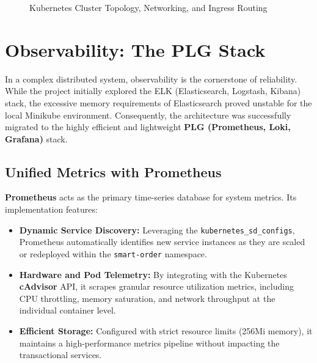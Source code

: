 \documentclass[12pt,a4paper]{report}
\begin{document}
\begin{figure}[H]
    \centering
    \vspace{8cm} %
    \caption{Kubernetes Cluster Topology, Networking, and Ingress Routing}
\end{figure}

\chapter{Observability: The PLG Stack}
In a complex distributed system, observability is the cornerstone of reliability. While the project initially explored the ELK (Elasticsearch, Logstash, Kibana) stack, the excessive memory requirements of Elasticsearch proved unstable for the local Minikube environment. Consequently, the architecture was successfully migrated to the highly efficient and lightweight \textbf{PLG (Prometheus, Loki, Grafana)} stack.

\section{Unified Metrics with Prometheus}
\textbf{Prometheus} acts as the primary time-series database for system metrics. Its implementation features:
\begin{itemize}
    \item \textbf{Dynamic Service Discovery:} Leveraging the \texttt{kubernetes\_sd\_configs}, Prometheus automatically identifies new service instances as they are scaled or redeployed within the \texttt{smart-order} namespace.
    \item \textbf{Hardware and Pod Telemetry:} By integrating with the Kubernetes \textbf{cAdvisor} API, it scrapes granular resource utilization metrics, including CPU throttling, memory saturation, and network throughput at the individual container level.
    \item \textbf{Efficient Storage:} Configured with strict resource limits (256Mi memory), it maintains a high-performance metrics pipeline without impacting the transactional services.
\end{itemize}
\end{document}
